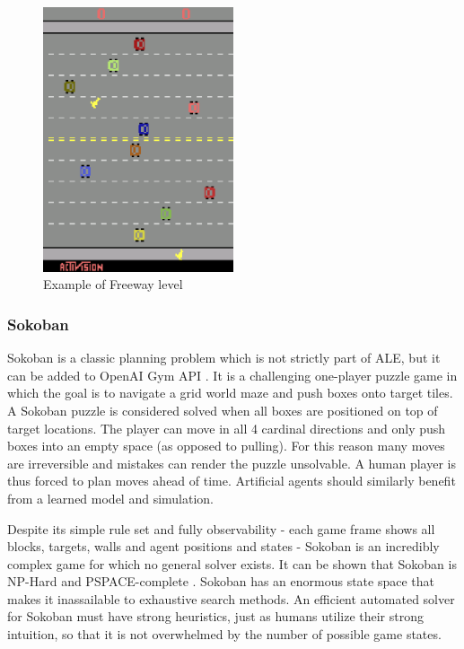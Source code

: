 \begin{figure}[H]
\includegraphics[width=0.5\textwidth,keepaspectratio]{figures/Freeway.png}
\caption[Freeway]{Example of Freeway level}
\label{Fig.Freeway}
\end{figure}

\subsubsection{Sokoban}

Sokoban is a classic planning problem which is not strictly part of ALE, but it can be added to OpenAI Gym API \cite{Code.Sokoban}. It is a challenging one-player puzzle game in which the goal is to navigate a grid world maze and push boxes onto target tiles. A Sokoban puzzle is considered solved when all boxes are positioned on top of target locations. The player can move in all 4 cardinal directions and only push boxes into an empty space (as opposed to pulling). For this reason many moves are irreversible and mistakes can render the puzzle unsolvable. A human player is thus forced to plan moves ahead of time. Artificial agents should similarly benefit from a learned model and simulation.

Despite its simple rule set and fully observability - each game frame shows all blocks, targets, walls and agent positions and states - Sokoban is an incredibly complex game for which no general solver exists. It can be shown that Sokoban is NP-Hard and PSPACE-complete \cite{Benchmark.Sokoban}. Sokoban has an enormous state space that makes it inassailable to exhaustive search methods. An efficient automated solver for Sokoban must have strong heuristics, just as humans utilize their strong intuition, so that it is not overwhelmed by the number of possible game states.

